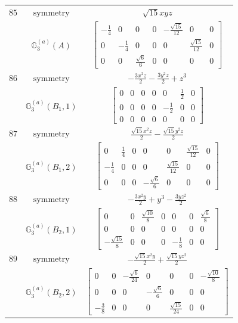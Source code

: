 \documentclass[fleqn,8pt,landscape]{jsarticle}
\begin{document}
\begin{longtable}{ccc}
$ 85 $ & $ \text{symmetry} $ & $ \sqrt{15} x y z $ \\
$  $ & $ \mathbb{G}_{3}^{(a)}(A) $ & $ \begin{bmatrix} - \frac{1}{4} & 0 & 0 & 0 & - \frac{\sqrt{15}}{12} & 0 & 0 \\ 0 & - \frac{1}{4} & 0 & 0 & 0 & \frac{\sqrt{15}}{12} & 0 \\ 0 & 0 & \frac{\sqrt{6}}{6} & 0 & 0 & 0 & 0 \end{bmatrix} $ \\ \hline
$ 86 $ & $ \text{symmetry} $ & $ - \frac{3 x^{2} z}{2} - \frac{3 y^{2} z}{2} + z^{3} $ \\
$  $ & $ \mathbb{G}_{3}^{(a)}(B_{1},1) $ & $ \begin{bmatrix} 0 & 0 & 0 & 0 & 0 & \frac{1}{2} & 0 \\ 0 & 0 & 0 & 0 & - \frac{1}{2} & 0 & 0 \\ 0 & 0 & 0 & 0 & 0 & 0 & 0 \end{bmatrix} $ \\ \hline
$ 87 $ & $ \text{symmetry} $ & $ \frac{\sqrt{15} x^{2} z}{2} - \frac{\sqrt{15} y^{2} z}{2} $ \\
$  $ & $ \mathbb{G}_{3}^{(a)}(B_{1},2) $ & $ \begin{bmatrix} 0 & \frac{1}{4} & 0 & 0 & 0 & \frac{\sqrt{15}}{12} & 0 \\ - \frac{1}{4} & 0 & 0 & 0 & \frac{\sqrt{15}}{12} & 0 & 0 \\ 0 & 0 & 0 & - \frac{\sqrt{6}}{6} & 0 & 0 & 0 \end{bmatrix} $ \\ \hline
$ 88 $ & $ \text{symmetry} $ & $ - \frac{3 x^{2} y}{2} + y^{3} - \frac{3 y z^{2}}{2} $ \\
$  $ & $ \mathbb{G}_{3}^{(a)}(B_{2},1) $ & $ \begin{bmatrix} 0 & 0 & \frac{\sqrt{10}}{8} & 0 & 0 & 0 & \frac{\sqrt{6}}{8} \\ 0 & 0 & 0 & 0 & 0 & 0 & 0 \\ - \frac{\sqrt{15}}{8} & 0 & 0 & 0 & - \frac{1}{8} & 0 & 0 \end{bmatrix} $ \\ \hline
$ 89 $ & $ \text{symmetry} $ & $ - \frac{\sqrt{15} x^{2} y}{2} + \frac{\sqrt{15} y z^{2}}{2} $ \\
$  $ & $ \mathbb{G}_{3}^{(a)}(B_{2},2) $ & $ \begin{bmatrix} 0 & 0 & - \frac{\sqrt{6}}{24} & 0 & 0 & 0 & - \frac{\sqrt{10}}{8} \\ 0 & 0 & 0 & - \frac{\sqrt{6}}{6} & 0 & 0 & 0 \\ - \frac{3}{8} & 0 & 0 & 0 & \frac{\sqrt{15}}{24} & 0 & 0 \end{bmatrix} $ \\ \hline

\end{longtable}
\end{document}
